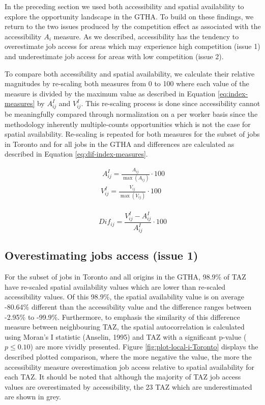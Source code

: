 \documentclass[]{elsarticle} %
\begin{document}
In the preceding section we used both accessibility and spatial
availability to explore the opportunity landscape in the GTHA. To build
on these findings, we return to the two issues produced by the
competition effect as associated with the accessibility \(A_i\) measure.
As we described, accessibility has the tendency to overestimate job
access for areas which may experience high competition (issue 1) and
underestimate job access for areas with low competition (issue 2).

To compare both accessibility and spatial availability, we calculate
their relative magnitudes by re-scaling both measures from 0 to 100
where each value of the measure is divided by the maximum value as
described in Equation \ref{eq:index-measures} by \(A^I_{ij}\) and
\(V^I_{ij}\). This re-scaling process is done since accessibility cannot
be meaningfully compared through normalization on a per worker basis
since the methodology inherently multiple-counts opportunities which is
not the case for spatial availability. Re-scaling is repeated for both
measures for the subset of jobs in Toronto and for all jobs in the GTHA
and differences are calculated as described in Equation
\ref{eq:dif-index-measures}.

\begin{equation}
\label{eq:index-measures}
\begin{array}{l}\
A^I_{ij} = \frac{A_{ij}}{\max(A_{ij})}\cdot100\\
V^I_{ij} = \frac{V_{ij}}{\max(V_{ij})}\cdot100\\
\end{array}
\end{equation}

\begin{equation}
\label{eq:dif-index-measures}
Dif_{ij} = \frac{V^I_{ij} - A^I_{ij}}{A^I_{ij}}\cdot100
\end{equation}

\hypertarget{overestimating-jobs-access-issue-1}{%
\subsection{Overestimating jobs access (issue
1)}\label{overestimating-jobs-access-issue-1}}

For the subset of jobs in Toronto and all origins in the GTHA, 98.9\% of
TAZ have re-scaled spatial availability values which are lower than
re-scaled accessibility values. Of this 98.9\%, the spatial availability
value is on average -80.64\% different than the accessibility value and
the difference ranges between -2.95\% to -99.9\%. Furthermore, to
emphasis the similarity of this difference measure between neighbouring
TAZ, the spatial autocorrelation is calculated using Moran's I statistic
(Anselin, 1995) and TAZ with a significant p-value (\(p\le 0.10\)) are
more vividly presented. Figure \ref{fig:plot-local-i-Toronto} displays
the described plotted comparison, where the more negative the value, the
more the accessibility measure overestimation job access relative to
spatial availability for each TAZ. It should be noted that although the
majority of TAZ job access values are overestimated by accessibility,
the 23 TAZ which are underestimated are shown in grey.
\end{document}
